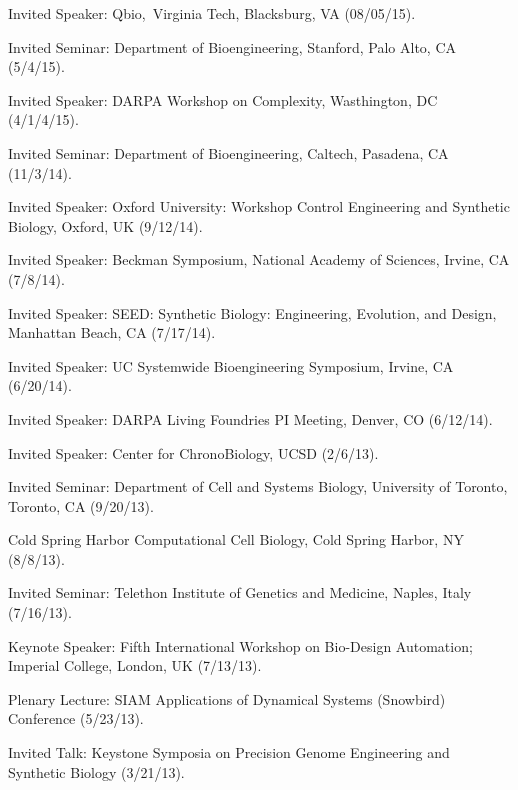 \item Invited Speaker: Qbio, Virginia Tech, Blacksburg, VA (08/05/15).

\item Invited Seminar: Department of Bioengineering, Stanford, Palo Alto, CA (5/4/15).

\item Invited Speaker: DARPA Workshop on Complexity, Wasthington, DC (4/1/4/15).

\item Invited Seminar: Department of Bioengineering, Caltech, Pasadena, CA (11/3/14).

\item  Invited Speaker: Oxford University: Workshop Control Engineering and Synthetic Biology, Oxford, UK (9/12/14).

\item Invited Speaker: Beckman Symposium, National Academy of Sciences, Irvine, CA (7/8/14).

\item Invited Speaker: SEED: Synthetic Biology: Engineering, Evolution, and Design, Manhattan Beach, CA (7/17/14).

\item Invited Speaker: UC Systemwide Bioengineering Symposium, Irvine, CA (6/20/14).

\item Invited Speaker:  DARPA Living Foundries PI Meeting, Denver, CO (6/12/14).

\item Invited Speaker: Center for ChronoBiology, UCSD (2/6/13).

\item Invited Seminar: Department of Cell and Systems Biology, University of Toronto, Toronto, CA (9/20/13).

\item Cold Spring Harbor Computational Cell Biology, Cold Spring Harbor, NY (8/8/13).

\item Invited Seminar: Telethon Institute of Genetics and Medicine, Naples, Italy (7/16/13).

\item Keynote Speaker: Fifth International Workshop on Bio-Design Automation; Imperial College, London, UK (7/13/13).

\item Plenary Lecture: SIAM Applications of Dynamical Systems (Snowbird) Conference (5/23/13).

\item Invited Talk: Keystone Symposia on Precision Genome Engineering and Synthetic Biology (3/21/13).

